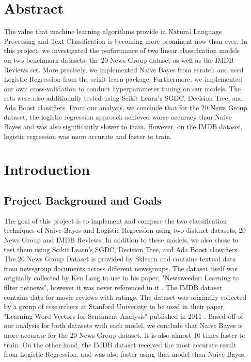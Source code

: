 \documentclass{homework}
\title{COMP-551 Mini-Assignment 2 \and COMP-551 Winter 2021}
\author{Arneet Singh Kalra, Behnaz Ghefati Feizabadi, Hussein Lakkis}
\date{February 28, 2021}
\begin{document}
\maketitle
\section{Abstract}
The value that machine learning algorithms provide in Natural Language Processing and Text Classification is becoming more prominent now than ever. In this project, we investigated the performance of two linear classification models on two benchmark datasets: the 20 News Group dataset as well as the IMDB Reviews set. More precisely, we implemented Naive Bayes from scratch and used Logistic Regression from the scikit-learn package. Furthermore, we implemented our own cross-validation to conduct hyperparameter tuning on our models. The sets were also additionally tested using Scikit Learn's SGDC, Decision Tree, and Ada Boost classifiers. From our analysis, we conclude that for the 20 News Group dataset, the logistic regression approach achieved worse accuracy than Naive Bayes and was also significantly slower to train. However, on the IMDB dataset, logistic regression was more accurate and faster to train. 

\section{Introduction}
\subsection{Project Background and Goals}
The goal of this project is to implement and compare the two classification techniques of Naive Bayes and Logistic Regression using two distinct datasets, 20 News Group and IMDB Reviews. In addition to these models, we also chose to test them using Scikit Learn's SGDC, Decision Tree, and Ada Boost classifiers. The 20 News Group Dataset is provided by Sklearn and contains textual data from newsgroup documents across different newsgroups. The dataset itself was originally collected by Ken Lang to use in his paper, "Newsweeder: Learning to filter netnews", however it was never referenced in it \cite{Lang95}. The IMDB dataset contains data for movie reviews with ratings. The dataset was originally collected by a group of researchers at Stanford University to be used in their paper "Learning Word Vectors for Sentiment Analysis" published in 2011 \cite{maas-EtAl:2011:ACL-HLT2011}. Based off of our analysis for both datasets with each model, we conclude that Naive Bayes is more accurate for the 20 News Group dataset. It is also almost 10 times faster to train. On the other hand, the IMDB dataset received the most accurate result from Logistic Regression, and was also faster using that model than Naive Bayes.
\end{document}
